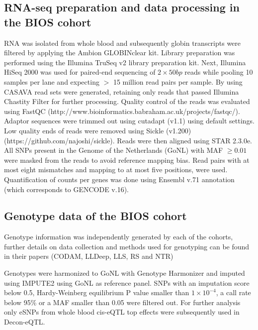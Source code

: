 \subsection{RNA-seq preparation and data processing in the BIOS cohort}
RNA was isolated from whole blood and subsequently globin transcripts were filtered by applying the Ambion GLOBINclear kit. Library preparation was performed using the Illumina TruSeq v2 library preparation kit. Next, Illumina HiSeq 2000 was used for paired-end sequencing of $2 \times 50 bp$ reads while pooling 10 samples per lane and expecting $>$ 15 million read pairs per sample. By using CASAVA read sets were generated, retaining only reads that passed Illumina Chastity Filter for further processing.
Quality control of the reads was evaluated using FastQC (http://www.bioinformatics.babraham.ac.uk/projects/fastqc/). Adaptor sequences were trimmed out using cutadapt (v1.1) using default settings. Low quality ends of reads were removed using Sickle (v1.200) (https://github.com/najoshi/sickle). 
Reads were then aligned using STAR 2.3.0e\cite{dobinSTARUltrafastUniversal2013}. All SNPs present in the Genome of the Netherlands (GoNL) with MAF $\geq 0.01$ were masked from the reads to avoid reference mapping bias. Read pairs with at most eight mismatches and mapping to at most five positions, were used. Quantification of counts per genes was done using Ensembl v.71 annotation (which corresponds to GENCODE v.16).

\subsection{Genotype data of the BIOS cohort}
Genotype information was independently generated by each of the cohorts, further details on data collection and methods used for genotyping can be found in their papers (CODAM\cite{damParentalHistoryDiabetes2001}, LLDeep\cite{tigchelaarCohortProfileLifeLines2015}, LLS\cite{deelenGenomewideAssociationMetaanalysis2014}, RS\cite{hofmanRotterdamStudy20162015} and NTR\cite{willemsenNetherlandsTwinRegister2010})

Genotypes were harmonized to GoNL with Genotype Harmonizer\cite{deelenGenotypeHarmonizerAutomatic2014}  and imputed using IMPUTE2\cite{howieFlexibleAccurateGenotype2009} using GoNL as reference panel. SNPs with an imputation score below 0.5, Hardy-Weinberg equilibrium P value smaller than $1 \times 10^{-4}$, a call rate below 95\% or a MAF smaller than 0.05 were filtered out. For further analysis only eSNPs from whole blood cis-eQTL top effects were subsequently used in Decon-eQTL. 

